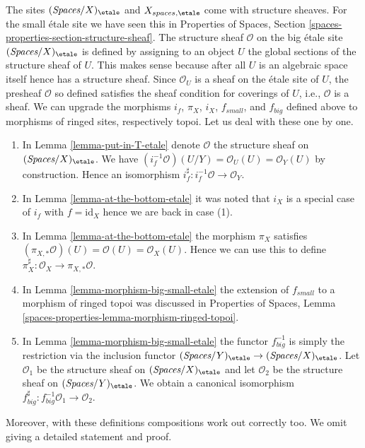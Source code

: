 \begin{remark}
\label{remark-change-topologies-ringed}
The sites $(\textit{Spaces}/X)_\etale$ and $X_{spaces, \etale}$
come with structure sheaves. For the small \'etale site we
have seen this in Properties of Spaces, Section
\ref{spaces-properties-section-structure-sheaf}.
The structure sheaf $\mathcal{O}$ on the big \'etale site
$(\textit{Spaces}/X)_\etale$ is defined by assigning to an object
$U$ the global sections of the structure sheaf of $U$.
This makes sense because after all $U$ is an algebraic space
itself hence has a structure sheaf. Since $\mathcal{O}_U$
is a sheaf on the \'etale site of $U$, the presheaf $\mathcal{O}$
so defined satisfies the sheaf condition for coverings of $U$, i.e.,
$\mathcal{O}$ is a sheaf.
We can upgrade the morphisms $i_f$, $\pi_X$, $i_X$, $f_{small}$, and
$f_{big}$ defined above to morphisms of ringed sites, respectively topoi.
Let us deal with these one by one.
\begin{enumerate}
\item In Lemma \ref{lemma-put-in-T-etale} denote $\mathcal{O}$
the structure sheaf on $(\textit{Spaces}/X)_\etale$.
We have $(i_f^{-1}\mathcal{O})(U/Y) = \mathcal{O}_U(U) = \mathcal{O}_Y(U)$
by construction.
Hence an isomorphism $i_f^\sharp : i_f^{-1}\mathcal{O} \to \mathcal{O}_Y$.
\item In Lemma \ref{lemma-at-the-bottom-etale} it was noted
that $i_X$ is a special case of $i_f$ with $f = \text{id}_X$
hence we are back in case (1).
\item In Lemma \ref{lemma-at-the-bottom-etale} the morphism
$\pi_X$ satisfies $(\pi_{X, *}\mathcal{O})(U) = \mathcal{O}(U) =
\mathcal{O}_X(U)$. Hence we can use this to define
$\pi_X^\sharp : \mathcal{O}_X \to \pi_{X, *}\mathcal{O}$.
\item In Lemma \ref{lemma-morphism-big-small-etale}
the extension of $f_{small}$ to a morphism of ringed topoi
was discussed in Properties of Spaces, Lemma
\ref{spaces-properties-lemma-morphism-ringed-topoi}.
\item In Lemma \ref{lemma-morphism-big-small-etale}
the functor $f_{big}^{-1}$ is simply the restriction
via the inclusion functor
$(\textit{Spaces}/Y)_\etale \to (\textit{Spaces}/X)_\etale$.
Let $\mathcal{O}_1$ be the structure sheaf on $(\textit{Spaces}/X)_\etale$
and let $\mathcal{O}_2$ be the structure sheaf on $(\textit{Spaces}/Y)_\etale$.
We obtain a canonical isomorphism
$f_{big}^\sharp : f_{big}^{-1}\mathcal{O}_1 \to \mathcal{O}_2$.
\end{enumerate}
Moreover, with these definitions compositions work out correctly too.
We omit giving a detailed statement and proof.
\end{remark}









